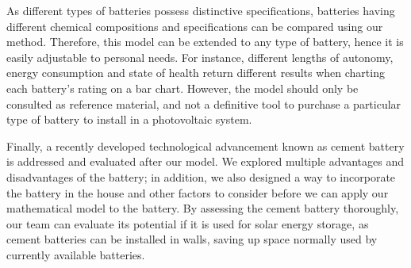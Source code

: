 {As different types of batteries possess distinctive specifications, batteries having different chemical compositions and specifications can be compared using our method. Therefore, this model can be extended to any type of battery, hence it is easily adjustable to personal needs. For instance, different lengths of autonomy, energy consumption and state of health return different results when charting each battery’s rating on a bar chart. However, the model should only be consulted as reference material, and not a definitive tool to purchase a particular type of battery to install in a photovoltaic system. 

Finally, a recently developed technological advancement known as cement battery is addressed and evaluated after our model. We explored multiple advantages and disadvantages of the battery; in addition, we also designed a way to incorporate the battery in the house and other factors to consider before we can apply our mathematical model to the battery. By assessing the cement battery thoroughly, our team can evaluate its potential if it is used for solar energy storage, as cement batteries can be installed in walls, saving up space normally used by currently available batteries.
\clearpage
\restoregeometry
}